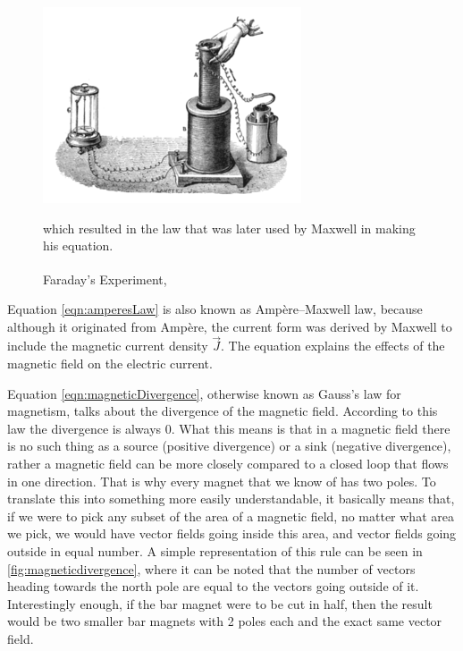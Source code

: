 \begin{figure}
	\centering
	\includegraphics{Figures/faradayexp}
	\decoRule
	\caption[Faraday's Experiment]{Faraday's Experiment,\textsuperscript{\cite{poyser1918magnetism}}} which resulted in the law that was later used by Maxwell in making his equation.
	\label{fig:faradayexp}
\end{figure}

Equation \ref{eqn:amperesLaw} is also known as Ampère–Maxwell law, because although it originated from Ampère, the current form was derived by Maxwell to include the magnetic current density $\vec{J}$. The equation explains the effects of the magnetic field on the electric current.

Equation \ref{eqn:magneticDivergence}, otherwise known as Gauss's law for magnetism, talks about the divergence of the magnetic field. According to this law the divergence is always 0. What this means is that in a magnetic field there is no such thing as a source (positive divergence) or a sink (negative divergence), rather a magnetic field can be more closely compared to a closed loop that flows in one direction. That is why every magnet that we know of has two poles. To translate this into something more easily understandable, it basically means that, if we were to pick any subset of the area of a magnetic field, no matter what area we pick, we would have vector fields going inside this area, and vector fields going outside in equal number. A simple representation of this rule can be seen in \ref{fig:magneticdivergence}, where it can be noted that the number of vectors heading towards the north pole are equal to the vectors going outside of it. Interestingly enough, if the bar magnet were to be cut in half, then the result would be two smaller bar magnets with 2 poles each and the exact same vector field.

